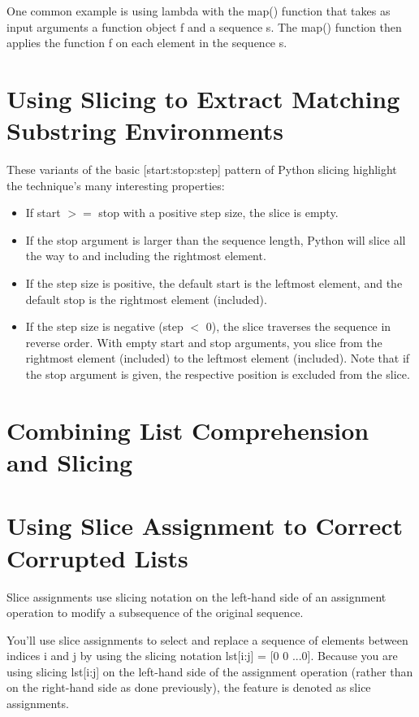 One common example is using lambda with the map() function that takes as input arguments a function object f and a sequence s. The map() function then applies the function f on each element in the sequence s.
\section{Using Slicing to Extract Matching Substring Environments}

These variants of the basic \textsf{[start:stop:step]} pattern of Python slicing
highlight the technique's many interesting properties:
\begin{itemize}
    \item If start $>=$ stop with a positive step size, the slice is empty.
    \item If the stop argument is larger than the sequence length, Python will slice all the way to and including the rightmost element.
    \item If the step size is positive, the default start is the leftmost element, and the default stop is the rightmost element (included).
    \item If the step size is negative (step $<$ 0), the slice traverses the sequence in reverse order. With empty start and stop arguments, you slice from the rightmost element (included) to the leftmost element (included). Note that if the stop argument is given, the respective position is excluded from the slice.
\end{itemize}

\section{Combining List Comprehension and Slicing}

\section{Using Slice Assignment to Correct Corrupted Lists}
Slice assignments use slicing notation on the left-hand side of an assignment operation to modify a subsequence of the original sequence.

You'll use slice assignments to select and replace a sequence of elements between indices i and j by using the slicing notation lst[i:j] = [0 0 ...0]. Because you are using slicing lst[i:j] on the left-hand side of the assignment operation (rather than on the right-hand side as done previously), the feature is denoted as slice assignments.

